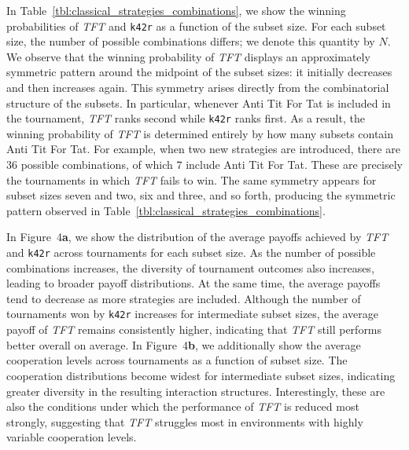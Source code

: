 \documentclass{article}
\newcommand{\TFT}{\emph{TFT}}
\begin{document}
In Table~\ref{tbl:classical_strategies_combinations}, we show the winning
probabilities of \TFT{} and \texttt{k42r} as a function of the subset size.
For each subset size, the number of possible combinations differs; we denote
this quantity by \(N\). We observe that the winning probability of \TFT{}
displays an approximately symmetric pattern around the midpoint of the subset
sizes: it initially decreases and then increases again. This symmetry arises
directly from the combinatorial structure of the subsets.
In particular, whenever Anti Tit For Tat is included in the tournament,
\TFT{} ranks second while \texttt{k42r} ranks first. As a result, the winning
probability of \TFT{} is determined entirely by how many subsets contain Anti
Tit For Tat. For example, when two new strategies are introduced, there are
\(36\) possible combinations, of which \(7\) include Anti Tit For Tat. These
are precisely the tournaments in which \TFT{} fails to win. The same symmetry
appears for subset sizes seven and two, six and three, and so forth, producing
the symmetric pattern observed in Table~\ref{tbl:classical_strategies_combinations}.

In Figure~4\textbf{a}, we show the
distribution of the average payoffs achieved by \TFT{} and \texttt{k42r} across
tournaments for each subset size. As the number of possible combinations
increases, the diversity of tournament outcomes also increases, leading to
broader payoff distributions. At the same time, the average payoffs tend to
decrease as more strategies are included. Although the number of tournaments won
by \texttt{k42r} increases for intermediate subset sizes, the average payoff of
\TFT{} remains consistently higher, indicating that \TFT{} still performs
better overall on average.
In Figure~4\textbf{b}, we additionally
show the average cooperation levels across tournaments as a function of subset
size. The cooperation distributions become widest for intermediate subset sizes,
indicating greater diversity in the resulting interaction structures.
Interestingly, these are also the conditions under which the performance of
\TFT{} is reduced most strongly, suggesting that \TFT{} struggles most in
environments with highly variable cooperation levels.

\begin{table}[!hbtp]
    \centering
    \resizebox{\textwidth}{!}{
    }
    \caption{\textbf{Winning probabilities of \TFT{} and \texttt{k42r} with
    different combinations of classical strategies.} We consider all possible
    combinations of the nine classical strategies listed in
    Table~\ref{tbl:extra_invitations_classic_strategies}. For each subset size,
    we evaluate every possible combination of strategies added to
    the original tournament, and we record the winning probabilities of \TFT{}
    and \texttt{k42r}. The number of combinations for each subset size is
    denoted by \(N\).}
    \label{tbl:classical_strategies_combinations}
\end{table}
\end{document}

